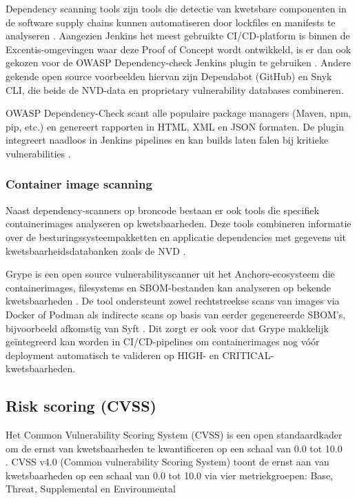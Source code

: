 Dependency scanning tools zijn tools die detectie van kwetsbare componenten in de software supply chains kunnen automatiseren door lockfiles en manifests te analyseren \autocite{Aikido2024}. Aangezien Jenkins het meest gebruikte CI/CD-platform is binnen de Excentis-omgevingen waar deze Proof of Concept wordt ontwikkeld, is er dan ook gekozen voor de OWASP Dependency-check Jenkins plugin te gebruiken \autocite{OWASPDependencyCheckPlugin}. Andere gekende open source voorbeelden hiervan zijn Dependabot (GitHub) en Snyk CLI, die beide de NVD-data en proprietary vulnerability databases combineren.

OWASP Dependency-Check scant alle populaire package managers (Maven, npm, pip, etc.) en genereert rapporten in HTML, XML en JSON formaten. De plugin integreert naadloos in Jenkins pipelines en kan builds laten falen bij kritieke vulnerabilities \autocite{OWASP2024}.

\subsubsection{Container image scanning}

Naast dependency-scanners op broncode bestaan er ook tools die specifiek containerimages analyseren op kwetsbaarheden. Deze tools combineren informatie over de besturingssysteempakketten en applicatie dependencies met gegevens uit kwetsbaarheidsdatabanken zoals de NVD \autocite{AnchoreOpensource,BionSyftGrype}.

Grype is een open source vulnerabilityscanner uit het Anchore-ecosysteem die containerimages, filesystems en SBOM-bestanden kan analyseren op bekende kwetsbaarheden \autocite{GrypeGithub}. De tool ondersteunt zowel rechtstreekse scans van images via Docker of Podman als indirecte scans op basis van eerder gegenereerde SBOM's, bijvoorbeeld afkomstig van Syft \autocite{JitSyftGrype}. Dit zorgt er ook voor dat Grype makkelijk geïntegreerd kan worden in CI/CD-pipelines om containerimages nog vóór deployment automatisch te valideren op HIGH- en CRITICAL-\\kwetsbaarheden. 

\subsection{Risk scoring (CVSS)}

Het Common Vulnerability Scoring System (CVSS) is een open standaardkader om de ernst van kwetsbaarheden te kwantificeren op een schaal van 0.0 tot 10.0\\\autocite{firstCVSSv4}. CVSS v4.0 (Common vulnerability Scoring System) toont de ernst aan van kwetsbaarheden op een schaal van 0.0 tot 10.0 via vier metriekgroepen: Base, Threat, Supplemental en Environmental \autocite{firstCVSSv4}

